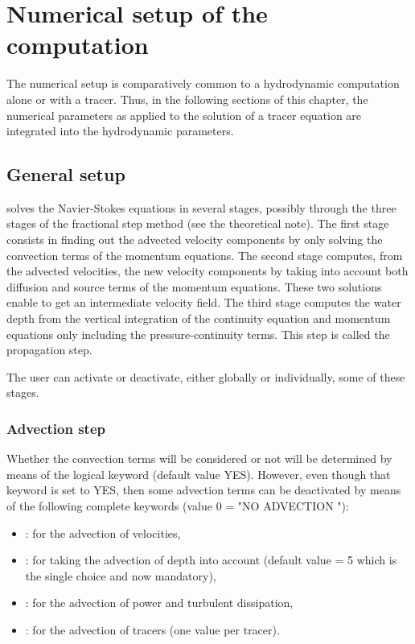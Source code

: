 \chapter{Numerical setup of the computation}

The numerical setup is comparatively common to a hydrodynamic computation alone
or with a tracer. Thus, in the following sections of this chapter, the
numerical parameters as applied to the solution of a tracer equation are
integrated into the hydrodynamic parameters.

\section{General setup}

 solves the Navier-Stokes equations in several stages, possibly
through the three stages of the fractional step method (see the theoretical
note). The first stage consists in finding out the advected velocity components
by only solving the convection terms of the momentum equations. The second
stage computes, from the advected velocities, the new velocity components by
taking into account both diffusion and source terms of the momentum equations.
These two solutions enable to get an intermediate velocity field. The third
stage computes the water depth from the vertical integration of the continuity
equation and momentum equations only including the pressure-continuity terms.
This step is called the propagation step.

The user can activate or deactivate, either globally or individually, some of
these stages.


\subsection{Advection step}
\label{sec:advstep}
Whether the convection terms will be considered or not will be determined by
means of the logical keyword  (default
value YES). However, even though that keyword is set to YES, then some
advection terms can be deactivated by means of the following complete keywords
(value 0 = "NO ADVECTION "):

\begin{itemize}
\item {}: for the advection of
velocities,

\item {}: for taking the advection of
depth into account (default value = 5 which is the single choice and now
mandatory),

\item {}: for the advection of power
and turbulent dissipation,

\item {}: for the advection of tracers
(one value per tracer).
\end{itemize}

